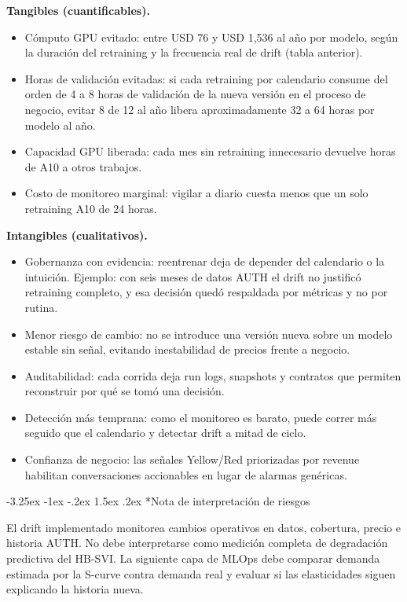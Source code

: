 \documentclass[11pt,letterpaper]{article}
\makeatletter
\renewcommand\subsection{\@startsection{subsection}{2}{\z@}
  {-3.25ex \@plus -1ex \@minus -.2ex}
  {1.5ex \@plus .2ex}
  {\large\bfseries\sffamily\color{azulTec}}}
\makeatother
\begin{document}
\textbf{Tangibles (cuantificables).}
\begin{itemize}
  \item Cómputo GPU evitado: entre USD 76 y USD 1,536 al año por modelo, según la duración del retraining y la frecuencia real de drift (tabla anterior).
  \item Horas de validación evitadas: si cada retraining por calendario consume del orden de 4 a 8 horas de validación de la nueva versión en el proceso de negocio, evitar 8 de 12 al año libera aproximadamente 32 a 64 horas por modelo al año.
  \item Capacidad GPU liberada: cada mes sin retraining innecesario devuelve horas de A10 a otros trabajos.
  \item Costo de monitoreo marginal: vigilar a diario cuesta menos que un solo retraining A10 de 24 horas.
\end{itemize}

\textbf{Intangibles (cualitativos).}
\begin{itemize}
  \item Gobernanza con evidencia: reentrenar deja de depender del calendario o la intuición. Ejemplo: con seis meses de datos AUTH el drift no justificó retraining completo, y esa decisión quedó respaldada por métricas y no por rutina.
  \item Menor riesgo de cambio: no se introduce una versión nueva sobre un modelo estable sin señal, evitando inestabilidad de precios frente a negocio.
  \item Auditabilidad: cada corrida deja run logs, snapshots y contratos que permiten reconstruir por qué se tomó una decisión.
  \item Detección más temprana: como el monitoreo es barato, puede correr más seguido que el calendario y detectar drift a mitad de ciclo.
  \item Confianza de negocio: las señales Yellow/Red priorizadas por revenue habilitan conversaciones accionables en lugar de alarmas genéricas.
\end{itemize}

\subsection*{Nota de interpretación de riesgos}

El drift implementado monitorea cambios operativos en datos, cobertura, precio e historia AUTH. No debe interpretarse como medición completa de degradación predictiva del HB-SVI. La siguiente capa de MLOps debe comparar demanda estimada por la S-curve contra demanda real y evaluar si las elasticidades siguen explicando la historia nueva.
\end{document}

